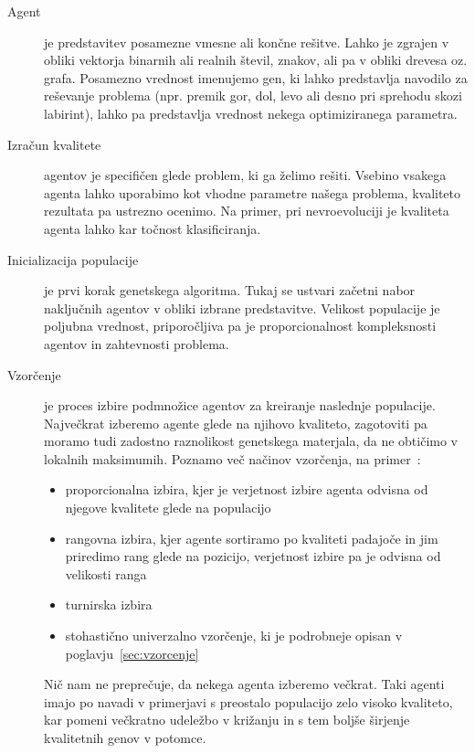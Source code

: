 \documentclass[a4paper,12pt,openright]{book}
\begin{document}
    \begin{description}
        \item[Agent]{je predstavitev posamezne vmesne ali končne rešitve. Lahko je zgrajen v obliki vektorja binarnih ali realnih
            števil, znakov, ali pa v obliki drevesa oz. grafa. Posamezno vrednost imenujemo gen, ki lahko predstavlja navodilo za
            reševanje problema (npr. premik gor, dol, levo ali desno pri sprehodu skozi labirint), lahko pa predstavlja
            vrednost nekega optimiziranega parametra. }
        \item[Izračun kvalitete]{agentov je specifičen glede problem, ki ga želimo rešiti. Vsebino vsakega agenta lahko uporabimo
            kot vhodne parametre našega problema, kvaliteto rezultata pa ustrezno ocenimo. Na primer, pri nevroevoluciji
            je kvaliteta agenta lahko kar točnost klasificiranja.}
        \item[Inicializacija populacije]{je prvi korak genetskega algoritma.
            Tukaj se ustvari začetni nabor naključnih agentov v obliki izbrane predstavitve.
            Velikost populacije je poljubna vrednost, priporočljiva pa je proporcionalnost kompleksnosti agentov in zahtevnosti problema.}
        \item[Vzorčenje]{je proces izbire podmnožice agentov za kreiranje naslednje populacije.
            Največkrat izberemo agente glede na njihovo kvaliteto, zagotoviti pa moramo tudi zadostno raznolikost genetskega
            materjala, da ne obtičimo v lokalnih maksimumih. Poznamo več načinov vzorčenja, na primer~\cite{inteligentni_sistemi_2010}:
            \begin{itemize}
                \item proporcionalna izbira, kjer je verjetnost izbire agenta odvisna od njegove kvalitete glede na populacijo
                \item rangovna izbira, kjer agente sortiramo po kvaliteti padajoče in jim priredimo rang glede na pozicijo, verjetnost izbire pa je odvisna od velikosti ranga
                \item turnirska izbira
                \item stohastično univerzalno vzorčenje, ki je podrobneje opisan v poglavju~\ref{sec:vzorcenje}
            \end{itemize}
            Nič nam ne preprečuje, da nekega agenta izberemo večkrat.
            Taki agenti imajo po navadi v primerjavi s preostalo populacijo zelo visoko kvaliteto, kar pomeni večkratno udeležbo
            v križanju in s tem boljše širjenje kvalitetnih genov v potomce.
}
\end{description}
\end{document}
